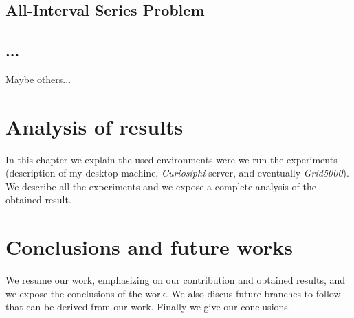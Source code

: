 \documentclass[a4paper]{book} %
\begin{document}

\section{All-Interval Series Problem}


\section{...}

Maybe others...

\chapter{Analysis of results}

In this chapter we explain the used environments were we run the experiments (description of my desktop machine, \textit{Curiosiphi} server, and eventually \textit{Grid5000}). We describe all the experiments and we expose a complete analysis of the obtained result.

\chapter{Conclusions and future works}

We resume our work, emphasizing on our contribution and obtained results, and we expose the conclusions of the work. We also discus future branches to follow that can be derived from our work. Finally we give our conclusions. 
\end{document}
